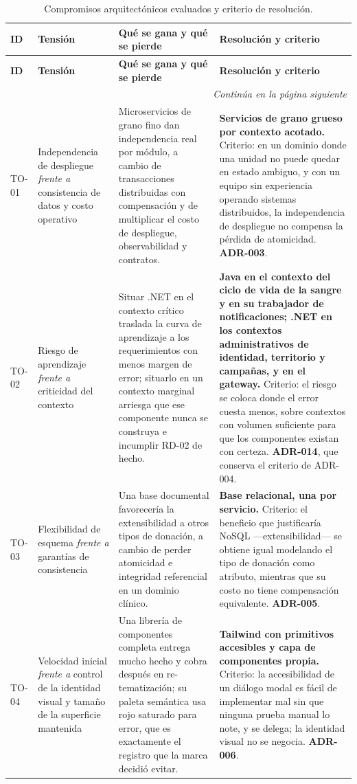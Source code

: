\documentclass[11pt,a4paper]{article}
\newcommand{\contlinea}[1]{\multicolumn{#1}{r}{\footnotesize\itshape Continúa en la página siguiente}}
\begin{document}
\begin{longtable}{L{1.2cm} L{3.4cm} L{4.6cm} L{4.7cm}}
\caption{Compromisos arquitectónicos evaluados y criterio de resolución.}\label{tab:tradeoffs}\\
\toprule
\textbf{ID} & \textbf{Tensión} & \textbf{Qué se gana y qué se pierde} & \textbf{Resolución y criterio} \\
\midrule
\endfirsthead
\toprule
\textbf{ID} & \textbf{Tensión} & \textbf{Qué se gana y qué se pierde} & \textbf{Resolución y criterio} \\
\midrule
\endhead
\midrule
\contlinea{4} \\
\endfoot
\bottomrule
\endlastfoot
TO-01 & Independencia de despliegue \emph{frente a} consistencia de datos y costo operativo & Microservicios de grano fino dan independencia real por módulo, a cambio de transacciones distribuidas con compensación y de multiplicar el costo de despliegue, observabilidad y contratos. & \textbf{Servicios de grano grueso por contexto acotado.} Criterio: en un dominio donde una unidad no puede quedar en estado ambiguo, y con un equipo sin experiencia operando sistemas distribuidos, la independencia de despliegue no compensa la pérdida de atomicidad. \textbf{ADR-003}. \\
TO-02 & Riesgo de aprendizaje \emph{frente a} criticidad del contexto & Situar .NET en el contexto crítico traslada la curva de aprendizaje a los requerimientos con menos margen de error; situarlo en un contexto marginal arriesga que ese componente nunca se construya e incumplir RD-02 de hecho. & \textbf{Java en el contexto del ciclo de vida de la sangre y en su trabajador de notificaciones; .NET en los contextos administrativos de identidad, territorio y campañas, y en el gateway.} Criterio: el riesgo se coloca donde el error cuesta menos, sobre contextos con volumen suficiente para que los componentes existan con certeza. \textbf{ADR-014}, que conserva el criterio de ADR-004. \\
TO-03 & Flexibilidad de esquema \emph{frente a} garantías de consistencia & Una base documental favorecería la extensibilidad a otros tipos de donación, a cambio de perder atomicidad e integridad referencial en un dominio clínico. & \textbf{Base relacional, una por servicio.} Criterio: el beneficio que justificaría NoSQL ---extensibilidad--- se obtiene igual modelando el tipo de donación como atributo, mientras que su costo no tiene compensación equivalente. \textbf{ADR-005}. \\
TO-04 & Velocidad inicial \emph{frente a} control de la identidad visual y tamaño de la superficie mantenida & Una librería de componentes completa entrega mucho hecho y cobra después en re-tematización; su paleta semántica usa rojo saturado para error, que es exactamente el registro que la marca decidió evitar. & \textbf{Tailwind con primitivos accesibles y capa de componentes propia.} Criterio: la accesibilidad de un diálogo modal es fácil de implementar mal sin que ninguna prueba manual lo note, y se delega; la identidad visual no se negocia. \textbf{ADR-006}. \\

\end{longtable}
\end{document}
